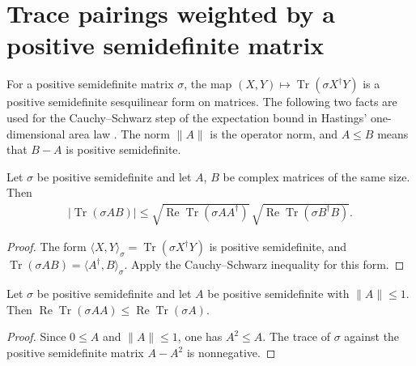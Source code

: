 \section{Trace pairings weighted by a positive semidefinite matrix}

For a positive semidefinite matrix $\sigma$, the map
$(X,Y)\mapsto\operatorname{Tr}(\sigma X^\dagger Y)$ is a positive semidefinite
sesquilinear form on matrices. The following two facts are used for the
Cauchy--Schwarz step of the expectation bound in Hastings' one-dimensional area
law \cite[lines 440--461]{Hastings2007AreaLaw}. The norm $\|A\|$ is the operator
norm, and $A\le B$ means that $B-A$ is positive semidefinite.

\begin{theorem}
    \label{thm:state_weighted_cauchy_schwarz}
    \leanok
    Let $\sigma$ be positive semidefinite and let $A$, $B$ be complex matrices of
    the same size. Then
    \begin{align*}
        \bigl|\operatorname{Tr}(\sigma AB)\bigr|
        \le\sqrt{\operatorname{Re}\operatorname{Tr}(\sigma AA^\dagger)}\,
        \sqrt{\operatorname{Re}\operatorname{Tr}(\sigma B^\dagger B)}.
    \end{align*}
\end{theorem}

\begin{proof}
    \leanok
    The form $\langle X,Y\rangle_\sigma=\operatorname{Tr}(\sigma X^\dagger Y)$ is
    positive semidefinite, and $\operatorname{Tr}(\sigma AB)=\langle A^\dagger,B\rangle_\sigma$.
    Apply the Cauchy--Schwarz inequality for this form.
\end{proof}

\begin{theorem}
    \label{thm:state_weighted_contraction_square}
    \leanok
    Let $\sigma$ be positive semidefinite and let $A$ be positive semidefinite with
    $\|A\|\le1$. Then
    $\operatorname{Re}\operatorname{Tr}(\sigma AA)\le\operatorname{Re}\operatorname{Tr}(\sigma A)$.
\end{theorem}

\begin{proof}
    \leanok
    Since $0\le A$ and $\|A\|\le1$, one has $A^2\le A$. The trace of $\sigma$ against
    the positive semidefinite matrix $A-A^2$ is nonnegative.
\end{proof}
